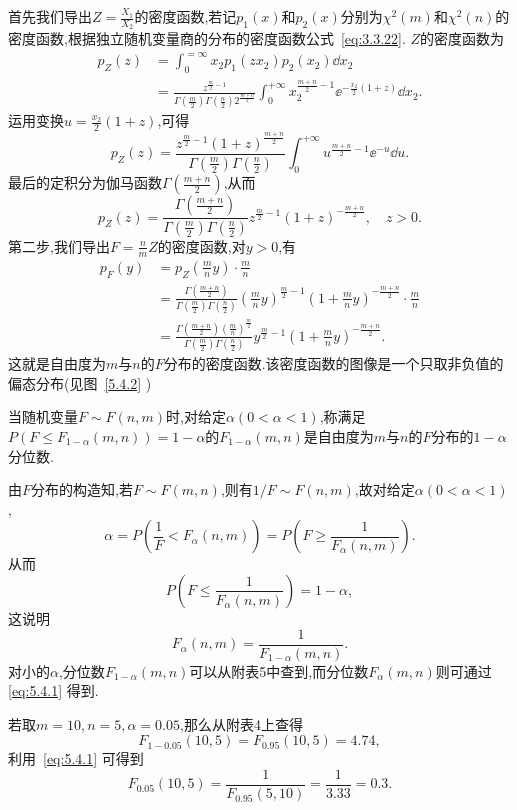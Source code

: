 首先我们导出$Z=\frac{X_1}{X_2}$的密度函数,若记$p_1(x)$和$p_2(x)$分别为$\chi^2(m)$和$\chi^2(n)$的密度函数,根据独立随机变量商的分布的密度函数公式~\eqref{eq:3.3.22}. $Z$的密度函数为
\begin{align*}
p_Z(z)&=\int_0^{=\infty}x_2p_1(zx_2)p_2(x_2)\dd x_2\\
&=\frac{z^{\frac{m}{2}-1}}{\Gamma \left( \frac{m}{2} \right) \Gamma \left( \frac{n}{2} \right) 2^{\frac{m+n}{2}}}\int_0^{+\infty}x_2^{\frac{m+n}2-1}\ee^{-\frac{x_2}2(1+z)}\dd x_2.
\end{align*}
运用变换$u=\frac{x_2}2(1+z)$,可得
\[p_Z(z)=\frac{z^{\frac{m}{2}-1}\left( 1+z \right) ^{\frac{m+n}{2}}}{\Gamma \left( \frac{m}{2} \right) \Gamma \left( \frac{n}{2} \right)}\int_0^{+\infty}u^{\frac{m+n}2-1}\ee^{-u}\dd u.\]
最后的定积分为伽马函数$\Gamma\left(\frac{m+n}2\right)$,从而
\[
p_Z\left( z \right) =\frac{\Gamma \left( \frac{m+n}{2} \right)}{\Gamma \left( \frac{m}{2} \right) \Gamma \left( \frac{n}{2} \right)}z^{\frac{m}{2}-1}\left( 1+z \right) ^{-\frac{m+n}{2}},\quad z>0.
\]
第二步,我们导出$F=\frac nm Z$的密度函数,对$y>0$,有
\begin{align*}
p_F\left( y \right) &=p_Z\left( \frac{m}{n}y \right) \cdot \frac{m}{n}\\
&=\frac{\Gamma \left( \frac{m+n}{2} \right)}{\Gamma \left( \frac{m}{2} \right) \Gamma \left( \frac{n}{2} \right)}\left( \frac{m}{n}y \right) ^{\frac{m}{2}-1}\left( 1+\frac{m}{n}y \right) ^{-\frac{m+n}{2}}\cdot \frac{m}{n}\\
&=\frac{\Gamma \left( \frac{m+n}{2} \right) \left( \frac{m}{n} \right) ^{\frac{m}{2}}}{\Gamma \left( \frac{m}{2} \right) \Gamma \left( \frac{n}{2} \right)}y^{\frac{m}{2}-1}\left( 1+\frac{m}{n}y \right) ^{-\frac{m+n}{2}}.
\end{align*}
这就是自由度为$m$与$n$的$F$分布的密度函数.该密度函数的图像是一个只取非负值的偏态分布(见图~\ref{5.4.2} )

当随机变量$F\sim F(n,m)$时,对给定$\alpha(0<\alpha<1)$,称满足$P(F\leq F_{1-\alpha}(m,n))=1-\alpha$的$F_{1-\alpha}(m,n)$是自由度为$m$与$n$的$F$分布的$1-\alpha$分位数.

由$F$分布的构造知,若$F\sim F(m,n)$,则有$1/F\sim F(n,m)$,故对给定$\alpha(0<\alpha<1)$,
\[
\alpha =P\left( \frac{1}{F}<F_{\alpha}\left( n,m \right) \right) =P\left( F\geq \frac{1}{F_{\alpha}\left( n,m \right)} \right).
\]
从而
\[
P\left( F\leq \frac{1}{F_{\alpha}\left( n,m \right)} \right) =1-\alpha,
\]
这说明
\begin{equation}\label{eq:5.4.1}
F_\alpha(n,m)=\frac1{F_{1-\alpha}(m,n)}.
\end{equation}
对小的$\alpha$,分位数$F_{1-\alpha}(m,n)$可以从附表5中查到,而分位数$F_\alpha(m,n)$则可通过 \eqref{eq:5.4.1} 得到.
\begin{example}\label{exam:5.4.1}
若取$m=10,n=5,\alpha=0.05$,那么从附表4上查得
\[F_{1-0.05}(10,5)=F_{0.95}(10,5)=4.74,\]
利用~\eqref{eq:5.4.1} 可得到
\[F_{0.05}(10,5)=\frac1{F_{0.95}(5,10)}=\frac1{3.33}=0.3.\]
\end{example}
